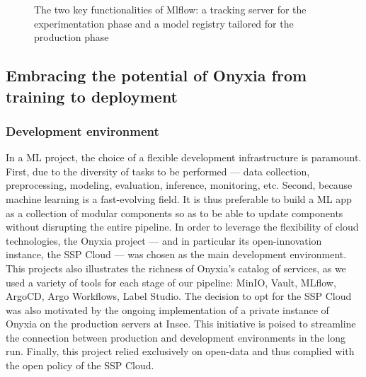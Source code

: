 \begin{figure}[htbp]
    \centering
    \caption{The two key functionalities of Mlflow: a tracking server for the experimentation phase and a model registry tailored for the production phase}
    \label{fig:mlflow-registry}
\end{figure}






\subsection{Embracing the potential of Onyxia from training to deployment}

\subsubsection{Development environment}

In a ML project, the choice of a flexible development infrastructure is paramount. First, due to the diversity of tasks to be performed — data collection, preprocessing, modeling, evaluation, inference, monitoring, etc. Second, because machine learning is a fast-evolving field. It is thus preferable to build a ML app as a collection of modular components so as to be able to update components without disrupting the entire pipeline. In order to leverage the flexibility of cloud technologies, the Onyxia project — and in particular its open-innovation instance, the SSP Cloud — was chosen as the main development environment. This projects also illustrates the richness of Onyxia's catalog of services, as we used a variety of tools for each stage of our pipeline: MinIO, Vault, MLflow, ArgoCD, Argo Workflows, Label Studio. The decision to opt for the SSP Cloud was also motivated by the ongoing implementation of a private instance of Onyxia on the production servers at Insee. This initiative is poised to streamline the connection between production and development environments in the long run. Finally, this project relied exclusively on open-data and thus complied with the open policy of the SSP Cloud.

